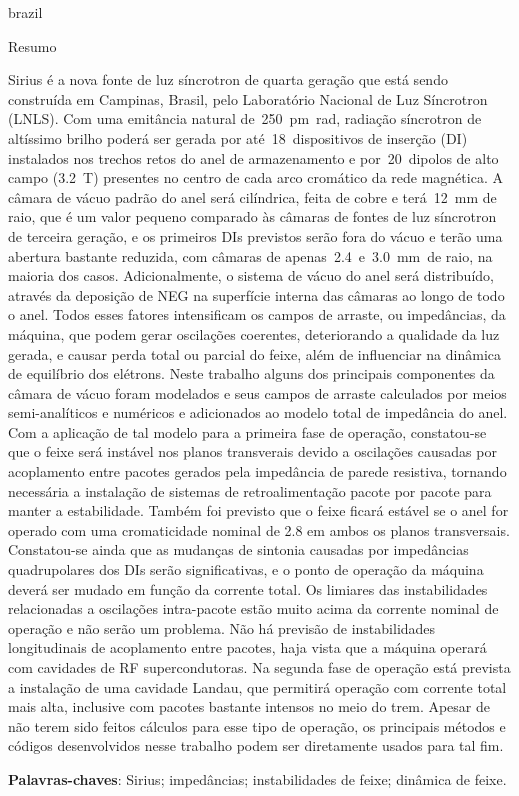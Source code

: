 \begin{otherlanguage*}{brazil}
    \begin{center}{\ABNTEXchapterfont\huge Resumo}\end{center}
    Sirius é a nova fonte de luz síncrotron de quarta geração que está sendo construída em Campinas, Brasil, pelo Laboratório Nacional de Luz Síncrotron (LNLS). Com uma emitância natural de~\SI{250}{\pico\meter\radian}, radiação síncrotron de altíssimo brilho poderá ser gerada por até~\si{18}~dispositivos de inserção (DI) instalados nos trechos retos do anel de armazenamento e por~\si{20}~dipolos de alto campo (\SI{3.2}{\tesla}) presentes no centro de cada arco cromático da rede magnética. A câmara de vácuo padrão do anel será cilíndrica, feita de cobre e terá~\SI{12}{\milli\meter} de raio, que é um valor pequeno comparado às câmaras de fontes de luz síncrotron de terceira geração, e os primeiros DIs previstos serão fora do vácuo e terão uma abertura bastante reduzida, com câmaras de apenas~\SI{2.4}{}~e~\SI{3.0}{\milli\meter}~de raio, na maioria dos casos. Adicionalmente, o sistema de vácuo do anel será distribuído, através da deposição de NEG na superfície interna das câmaras ao longo de todo o anel. Todos esses fatores intensificam os campos de arraste, ou impedâncias, da máquina, que podem gerar oscilações coerentes, deteriorando a qualidade da luz gerada, e causar perda total ou parcial do feixe, além de influenciar na dinâmica de equilíbrio dos elétrons. Neste trabalho alguns dos principais componentes da câmara de vácuo foram modelados e seus campos de arraste calculados por meios semi-analíticos e numéricos e adicionados ao modelo total de impedância do anel. Com a aplicação de tal modelo para a primeira fase de operação, constatou-se que o feixe será instável nos planos transverais devido a oscilações causadas por acoplamento entre pacotes gerados pela impedância de parede resistiva, tornando necessária a instalação de sistemas de retroalimentação pacote por pacote para manter a estabilidade. Também foi previsto que o feixe ficará estável se o anel for operado com uma cromaticidade nominal de 2.8 em ambos os planos transversais. Constatou-se ainda que as mudanças de sintonia causadas por impedâncias quadrupolares dos DIs serão significativas, e o ponto de operação da máquina deverá ser mudado em função da corrente total. Os limiares das instabilidades relacionadas a oscilações intra-pacote estão muito acima da corrente nominal de operação e não serão um problema. Não há previsão de instabilidades longitudinais de acoplamento entre pacotes, haja vista que a máquina operará com cavidades de RF supercondutoras. Na segunda fase de operação está prevista a instalação de uma cavidade Landau, que permitirá operação com corrente total mais alta, inclusive com pacotes bastante intensos no meio do trem. Apesar de não terem sido feitos cálculos para esse tipo de operação, os principais métodos e códigos desenvolvidos nesse trabalho podem ser diretamente usados para tal fim.

    \vspace{\onelineskip}
    \noindent\textbf{Palavras-chaves}: Sirius; impedâncias; instabilidades de feixe; dinâmica de feixe.
    \vspace{\fill}
\end{otherlanguage*}
